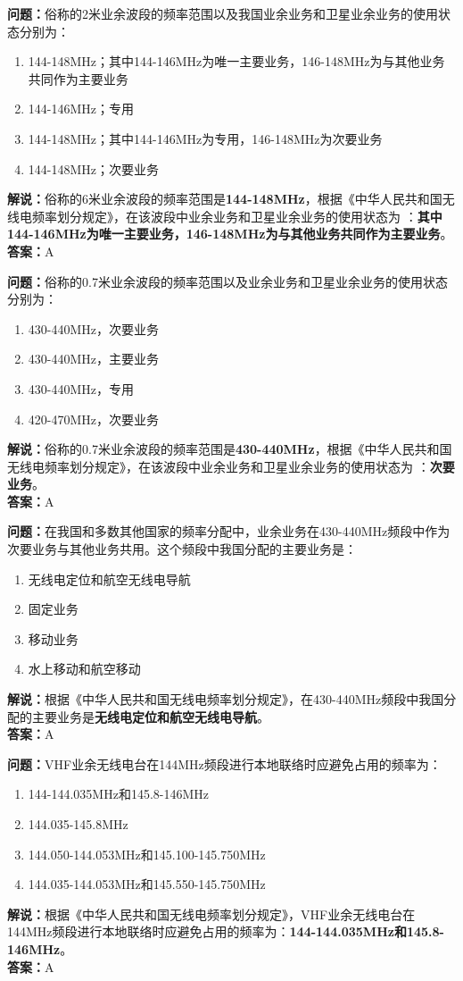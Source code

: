 \textbf{问题：}俗称的2米业余波段的频率范围以及我国业余业务和卫星业余业务的使用状态分别为：
\begin{enumerate}[label=\Alph*), leftmargin=1cm]
  \item 144-148MHz；其中144-146MHz为唯一主要业务，146-148MHz为与其他业务共同作为主要业务
  \item 144-146MHz；专用
  \item 144-148MHz；其中144-146MHz为专用，146-148MHz为次要业务
  \item 144-148MHz；次要业务
\end{enumerate}
\textbf{解说：}俗称的6米业余波段的频率范围是\textbf{144-148MHz}，根据《中华人民共和国无线电频率划分规定》，在该波段中业余业务和卫星业余业务的使用状态为 ：\textbf{其中144-146MHz为唯一主要业务，146-148MHz为与其他业务共同作为主要业务}。\\\textbf{答案：}A

\textbf{问题：}俗称的0.7米业余波段的频率范围以及业余业务和卫星业余业务的使用状态分别为：
\begin{enumerate}[label=\Alph*), leftmargin=1cm]
  \item 430-440MHz，次要业务
  \item 430-440MHz，主要业务
  \item 430-440MHz，专用
  \item 420-470MHz，次要业务
\end{enumerate}
\textbf{解说：}俗称的0.7米业余波段的频率范围是\textbf{430-440MHz}，根据《中华人民共和国无线电频率划分规定》，在该波段中业余业务和卫星业余业务的使用状态为 ：\textbf{次要业务}。\\\textbf{答案：}A

\textbf{问题：}在我国和多数其他国家的频率分配中，业余业务在430-440MHz频段中作为次要业务与其他业务共用。这个频段中我国分配的主要业务是：
\begin{enumerate}[label=\Alph*), leftmargin=1cm]
  \item 无线电定位和航空无线电导航
  \item 固定业务
  \item 移动业务
  \item 水上移动和航空移动
\end{enumerate}
\textbf{解说：}根据《中华人民共和国无线电频率划分规定》，在430-440MHz频段中我国分配的主要业务是\textbf{无线电定位和航空无线电导航}。\\\textbf{答案：}A

\textbf{问题：}VHF业余无线电台在144MHz频段进行本地联络时应避免占用的频率为：
\begin{enumerate}[label=\Alph*), leftmargin=1cm]
  \item 144-144.035MHz和145.8-146MHz
  \item 144.035-145.8MHz
  \item 144.050-144.053MHz和145.100-145.750MHz
  \item 144.035-144.053MHz和145.550-145.750MHz
\end{enumerate}
\textbf{解说：}根据《中华人民共和国无线电频率划分规定》，VHF业余无线电台在144MHz频段进行本地联络时应避免占用的频率为：\textbf{144-144.035MHz和145.8-146MHz}。\\\textbf{答案：}A%

